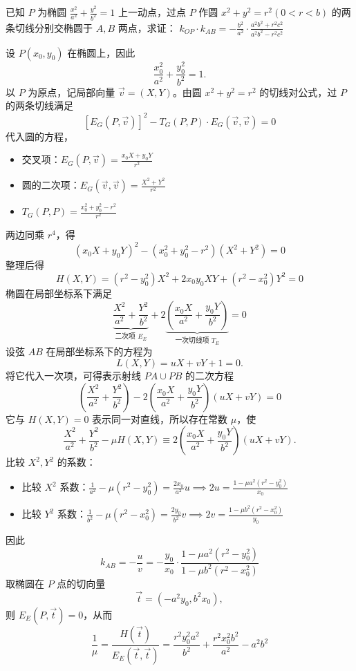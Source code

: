 \begin{exercise}[$k_{OP}\cdot k_{AB}$]
    已知 $P$ 为椭圆 $\frac{x^2}{a^2}+\frac{y^2}{b^2}=1$ 上一动点，过点 $P$ 作圆 $x^2+y^2=r^2 (0<r<b)$ 的两条切线分别交椭圆于 $A,B$ 两点，求证： $k_{OP}\cdot k_{AB}=-\frac{b^2}{a^2}\cdot \frac{a^2b^2+r^2c^2}{a^2b^2-r^2c^2}$
\end{exercise}
\begin{solution}
设 $P(x_0, y_0)$ 在椭圆上，因此
$$\frac{x_0^2}{a^2} + \frac{y_0^2}{b^2} = 1.$$
以 $P$ 为原点，记局部向量 $\vec{v} = (X, Y)$。由圆 $x^2+y^2=r^2$ 的切线对公式，过 $P$ 的两条切线满足
$$[E_G(P,\vec{v})]^2 - T_G(P,P) \cdot E_G(\vec{v},\vec{v}) = 0$$
代入圆的方程，
\begin{itemize}
\item 交叉项：$E_G(P,\vec{v}) = \frac{x_0 X + y_0 Y}{r^2}$
\item 圆的二次项：$E_G(\vec{v},\vec{v}) = \frac{X^2 + Y^2}{r^2}$
\item $T_G(P,P) = \frac{x_0^2 + y_0^2 - r^2}{r^2}$
\end{itemize}
两边同乘 $r^4$，得
$$(x_0 X + y_0 Y)^2 - (x_0^2 + y_0^2 - r^2)(X^2 + Y^2) = 0$$
整理后得
$$H(X,Y) = (r^2 - y_0^2)X^2 + 2x_0 y_0 XY + (r^2 - x_0^2)Y^2 = 0$$
椭圆在局部坐标系下满足
$$\underbrace{\frac{X^2}{a^2} + \frac{Y^2}{b^2}}_{\text{二次项 } E_E} + 2\underbrace{\left(\frac{x_0 X}{a^2} + \frac{y_0 Y}{b^2}\right)}_{\text{一次切线项 } T_E} = 0$$
设弦 $AB$ 在局部坐标系下的方程为
$$L(X,Y) = uX + vY + 1 = 0.$$
将它代入一次项，可得表示射线 $PA \cup PB$ 的二次方程
$$\left(\frac{X^2}{a^2} + \frac{Y^2}{b^2}\right) - 2\left(\frac{x_0 X}{a^2} + \frac{y_0 Y}{b^2}\right)(uX + vY) = 0$$
它与 $H(X,Y)=0$ 表示同一对直线，所以存在常数 $\mu$，使
$$\frac{X^2}{a^2} + \frac{Y^2}{b^2} - \mu H(X,Y) \equiv 2\left(\frac{x_0 X}{a^2} + \frac{y_0 Y}{b^2}\right)(uX + vY).$$
比较 $X^2,Y^2$ 的系数：
\begin{itemize}
\item 比较 $X^2$ 系数：$\frac{1}{a^2} - \mu(r^2 - y_0^2) = \frac{2x_0}{a^2}u \implies 2u = \frac{1 - \mu a^2(r^2 - y_0^2)}{x_0}$
\item 比较 $Y^2$ 系数：$\frac{1}{b^2} - \mu(r^2 - x_0^2) = \frac{2y_0}{b^2}v \implies 2v = \frac{1 - \mu b^2(r^2 - x_0^2)}{y_0}$
\end{itemize}
因此
$$k_{AB} = -\frac{u}{v} = -\frac{y_0}{x_0} \cdot \frac{1 - \mu a^2(r^2 - y_0^2)}{1 - \mu b^2(r^2 - x_0^2)}$$
取椭圆在 $P$ 点的切向量
$$\vec{t} = (-a^2 y_0, b^2 x_0),$$
则 $E_E(P,\vec{t})=0$，从而
$$\frac{1}{\mu} = \frac{H(\vec{t})}{E_E(\vec{t},\vec{t})} = \frac{r^2 y_0^2 a^2}{b^2} + \frac{r^2 x_0^2 b^2}{a^2} - a^2 b^2$$

\end{solution}
